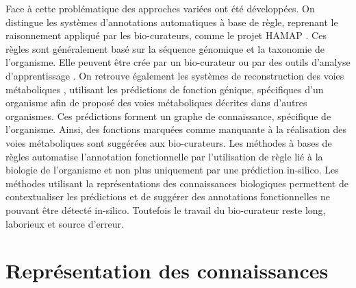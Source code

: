 Face à cette problématique des approches variées ont été développées. On distingue les systèmes d'annotations automatiques à base de règle, reprenant le raisonnement appliqué par les bio-curateurs, comme le projet HAMAP \cite{lima2009hamap}. Ces règles sont généralement basé sur la séquence génomique et la taxonomie de l'organisme. Elle peuvent être crée par un bio-curateur ou par des outils d'analyse d'apprentissage \cite{uniprot2011ongoing}. On retrouve également les systèmes de reconstruction des voies métaboliques \cite{karpe2011pathway}, utilisant les prédictions de fonction génique, spécifiques d'un organisme afin de proposé des voies métaboliques décrites dans d'autres organismes. Ces prédictions forment un graphe de connaissance, spécifique de l'organisme. Ainsi, des fonctions marquées comme manquante à la réalisation des voies métaboliques sont suggérées aux bio-curateurs. Les méthodes à bases de règles automatise l'annotation fonctionnelle par l'utilisation de règle lié à la biologie de l'organisme et non plus uniquement par une prédiction in-silico.  Les méthodes utilisant la représentations des connaissances biologiques permettent de contextualiser les prédictions et de suggérer des annotations fonctionnelles ne pouvant être détecté in-silico. Toutefois le travail du bio-curateur reste long, laborieux et source d'erreur.






\section{Représentation des connaissances}
